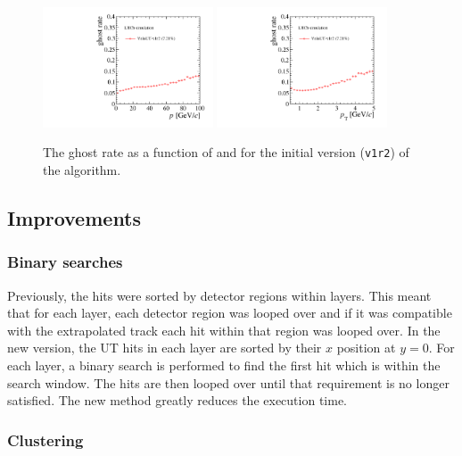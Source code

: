 \begin{figure}[!htb]
\centering
\includegraphics[width=0.45\textwidth]{figs/upstream-tracking-upgrade/gr_p_v1r2.pdf}
\includegraphics[width=0.45\textwidth]{figs/upstream-tracking-upgrade/gr_pt_v1r2.pdf}
\caption{The ghost rate as a function of \ptot and \pt for the initial version (\texttt{v1r2}) of the \velout algorithm.}
\label{fig:gr_velout_v1r2}
\end{figure}

\subsection{Improvements}

\subsubsection{Binary searches}

Previously, the hits were sorted by detector regions within layers. This meant that for each layer, each detector region was looped over and if it was compatible with the extrapolated \velo track each hit within that region was looped over. In the new version, the UT hits in each layer are sorted by their $x$ position at $y = 0$. For each layer, a binary search is performed to find the first hit which is within the search window. The hits are then looped over until that requirement is no longer satisfied. The new method greatly reduces the execution time.

\subsubsection{Clustering}

